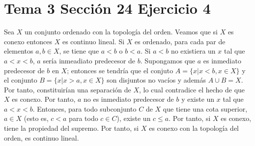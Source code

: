 \documentclass{article}
\begin{document}
\section{Tema 3 Sección 24 Ejercicio 4}
Sea $X$ un conjunto ordenado con la topología del orden. Veamos que si $X$ es conexo entonces $X$ es continuo lineal. Si $X$ es ordenado, para cada par de elementos $a,b\in X$, se tiene que $a<b$ o $b<a$. Si $a<b$ no existiera un $x$ tal que $a<x<b$, $a$ sería inmeadiato predecesor de $b$. Supongamos que $a$ es inmediato predecesor de $b$ en $X$; entonces se tendría que el conjuto $A=\{x| x< b, x\in X\}$ y el conjunto $B=\{x| x > a, x\in X\}$ son disjuntos no vacíos y además $A\cup B=X$. Por tanto, constituirían una separación de $X$, lo cual contradice el hecho de que $X$ es conexo. Por tanto, $a$ no es inmediato predecesor de $b$ y existe un $x$ tal que $a<x<b$. Entonces, para todo subconjunto $C$ de $X$ que tiene una cota superior, $a\in X$ (esto es, $c<a$ para todo $c\in C$), existe un $c\leq a$. Por tanto, si $X$ es conexo, tiene la propiedad del supremo. Por tanto, si $X$ es conexo con la topología del orden, es continuo lineal.
\end{document}
